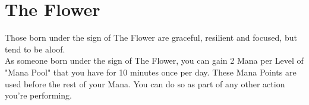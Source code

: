 \section{The Flower}

Those born under the sign of The Flower are graceful, resilient and focused, but tend to be aloof.\\
As someone born under the sign of The Flower, you can gain 2 Mana per Level of "Mana Pool" that you have for 10 minutes once per day. These Mana Points are used before the rest of your Mana. You can do so as part of any other action you're performing.\\